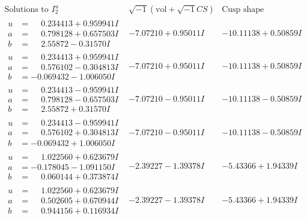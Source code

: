 \documentclass[1p]{elsarticle_modified}
\theoremstyle{definition}
\newcommand{\I}{\sqrt{-1}}
\begin{document}
$$\begin{array}{c|c|c}  
\text{Solutions to }I^u_{2}& \I (\text{vol} + \sqrt{-1}CS) & \text{Cusp shape}\\
 \hline 
\begin{aligned}
u &= \phantom{-}0.234413 + 0.959941 I \\
a &= \phantom{-}0.798128 + 0.657503 I \\
b &= \phantom{-}2.55872 - 0.31570 I\end{aligned}
 & -7.07210 + 0.95011 I & -10.11138 + 0.50859 I \\ \hline\begin{aligned}
u &= \phantom{-}0.234413 + 0.959941 I \\
a &= \phantom{-}0.576102 - 0.304813 I \\
b &= -0.069432 - 1.006050 I\end{aligned}
 & -7.07210 + 0.95011 I & -10.11138 + 0.50859 I \\ \hline\begin{aligned}
u &= \phantom{-}0.234413 - 0.959941 I \\
a &= \phantom{-}0.798128 - 0.657503 I \\
b &= \phantom{-}2.55872 + 0.31570 I\end{aligned}
 & -7.07210 - 0.95011 I & -10.11138 - 0.50859 I \\ \hline\begin{aligned}
u &= \phantom{-}0.234413 - 0.959941 I \\
a &= \phantom{-}0.576102 + 0.304813 I \\
b &= -0.069432 + 1.006050 I\end{aligned}
 & -7.07210 - 0.95011 I & -10.11138 - 0.50859 I \\ \hline\begin{aligned}
u &= \phantom{-}1.022560 + 0.623679 I \\
a &= -0.178045 - 1.091150 I \\
b &= \phantom{-}0.060144 + 0.373874 I\end{aligned}
 & -2.39227 - 1.39378 I & -5.43366 + 1.94339 I \\ \hline\begin{aligned}
u &= \phantom{-}1.022560 + 0.623679 I \\
a &= \phantom{-}0.502605 + 0.670944 I \\
b &= \phantom{-}0.944156 + 0.116934 I\end{aligned}
 & -2.39227 - 1.39378 I & -5.43366 + 1.94339 I \\ \hline\begin{aligned}

\end{aligned}
\end{array}$$
\end{document}
